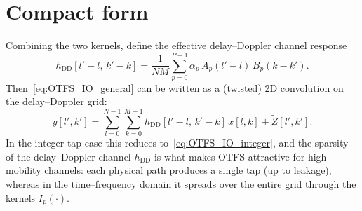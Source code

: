 \documentclass[11pt]{article}
\begin{document}
\section*{Compact form}

Combining the two kernels, define the effective delay--Doppler channel
response
\begin{equation}
    h_{\text{DD}}[l'-l,\,k'-k] = \frac{1}{NM}
        \sum_{p=0}^{P-1}\tilde{\alpha}_p\, A_p(l'-l)\, B_p(k-k').
\end{equation}
Then~\eqref{eq:OTFS_IO_general} can be written as a (twisted) 2D convolution
on the delay--Doppler grid:
\begin{equation}
    y[l',k'] = \sum_{l=0}^{N-1}\sum_{k=0}^{M-1}
               h_{\text{DD}}[l'-l,\,k'-k]\, x[l,k] + \tilde{Z}[l',k'].
\end{equation}
In the integer-tap case this reduces to~\eqref{eq:OTFS_IO_integer}, and the
sparsity of the delay--Doppler channel \(h_{\text{DD}}\) is what makes OTFS
attractive for high-mobility channels: each physical path produces a single
tap (up to leakage), whereas in the time--frequency domain it spreads over
the entire grid through the kernels \(I_p(\cdot)\).
\end{document}

